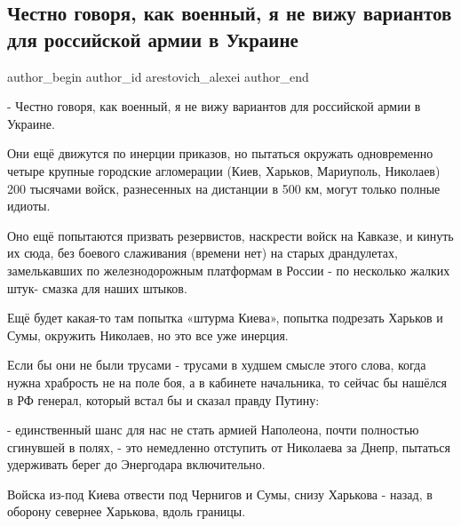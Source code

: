  
 
 
 
 
 
\subsection{Честно говоря, как военный, я не вижу вариантов для российской армии в Украине}
\label{sec:08_03_2022.fb.arestovich_alexei.1.varianty}
 
\ifcmt
 author_begin
   author_id arestovich_alexei
 author_end
\fi

- Честно говоря, как военный,  я не вижу вариантов для российской армии в
Украине.

Они ещё движутся по инерции приказов, но пытаться окружать одновременно четыре
крупные городские агломерации (Киев, Харьков, Мариуполь, Николаев) 200 тысячами
войск, разнесенных на дистанции в 500 км, могут только полные идиоты.


Оно ещё попытаются призвать резервистов, наскрести войск на Кавказе, и кинуть
их сюда, без боевого слаживания (времени нет) на старых драндулетах,
замелькавших по железнодорожным платформам в России - по несколько жалких штук-
смазка для наших штыков.

Ещё будет какая-то там попытка «штурма Киева», попытка подрезать Харьков и
Сумы, окружить Николаев, но это все уже инерция.

Если бы они не были трусами - трусами в худшем смысле этого слова, когда нужна
храбрость не на поле боя, а в кабинете начальника, то сейчас бы нашёлся в РФ
генерал, который встал бы и сказал правду Путину:

- единственный шанс для нас не стать армией Наполеона, почти полностью
сгинувшей в полях,  - это немедленно отступить от Николаева за Днепр, пытаться
удерживать берег до Энергодара включительно.

Войска из-под Киева отвести под Чернигов и Сумы, снизу Харькова - назад, в
оборону севернее Харькова, вдоль границы. 

